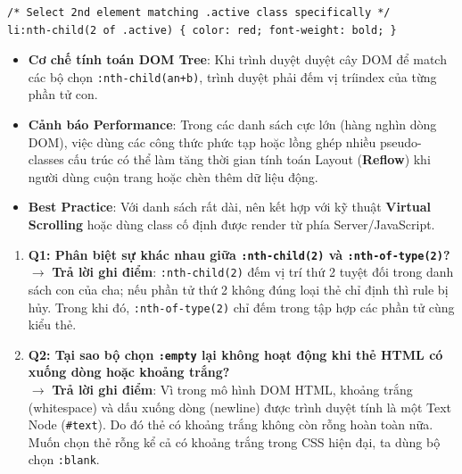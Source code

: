 \documentclass[11pt,oneside]{book}
\newcommand{\codeinline}[1]{\textcolor{accentOrange}{\texttt{#1}}}
\newcommand{\term}[1]{\textbf{\textcolor{primaryBlue}{#1}}}
\begin{document}
\begin{codeWindow}
\begin{lstlisting}[language=CSS3]
/* Select 2nd element matching .active class specifically */
li:nth-child(2 of .active) { color: red; font-weight: bold; }
\end{lstlisting}
\end{codeWindow}

\begin{warnBox}
\begin{itemize}[leftmargin=1.5em, itemsep=3pt, parsep=0pt]
    \item \textbf{Cơ chế tính toán DOM Tree}: Khi trình duyệt duyệt cây DOM để match các bộ chọn \codeinline{:nth-child(an+b)}, trình duyệt phải đếm vị tríindex của từng phần tử con.
    \item \textbf{Cảnh báo Performance}: Trong các danh sách cực lớn (hàng nghìn dòng DOM), việc dùng các công thức phức tạp hoặc lồng ghép nhiều pseudo-classes cấu trúc có thể làm tăng thời gian tính toán Layout (\term{Reflow}) khi người dùng cuộn trang hoặc chèn thêm dữ liệu động.
    \item \textbf{Best Practice}: Với danh sách rất dài, nên kết hợp với kỹ thuật \term{Virtual Scrolling} hoặc dùng class cố định được render từ phía Server/JavaScript.
\end{itemize}
\end{warnBox}

\begin{tipBox}
\begin{enumerate}[leftmargin=1.5em, itemsep=4pt, parsep=0pt]
    \item \textbf{Q1: Phân biệt sự khác nhau giữa \codeinline{:nth-child(2)} và \codeinline{:nth-of-type(2)}?} \\
    $\rightarrow$ \textbf{Trả lời ghi điểm}: \codeinline{:nth-child(2)} đếm vị trí thứ 2 tuyệt đối trong danh sách con của cha; nếu phần tử thứ 2 không đúng loại thẻ chỉ định thì rule bị hủy. Trong khi đó, \codeinline{:nth-of-type(2)} chỉ đếm trong tập hợp các phần tử cùng kiểu thẻ.
    \item \textbf{Q2: Tại sao bộ chọn \codeinline{:empty} lại không hoạt động khi thẻ HTML có xuống dòng hoặc khoảng trắng?} \\
    $\rightarrow$ \textbf{Trả lời ghi điểm}: Vì trong mô hình DOM HTML, khoảng trắng (whitespace) và dấu xuống dòng (newline) được trình duyệt tính là một Text Node (\codeinline{\#text}). Do đó thẻ có khoảng trắng không còn rỗng hoàn toàn nữa. Muốn chọn thẻ rỗng kể cả có khoảng trắng trong CSS hiện đại, ta dùng bộ chọn \codeinline{:blank}.
\end{enumerate}
\end{tipBox}
\end{document}
